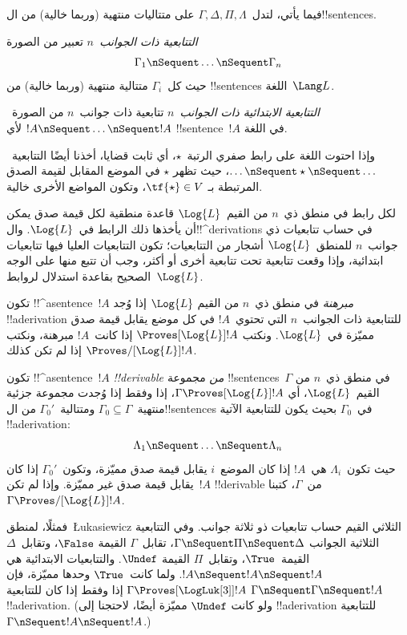 \documentclass[../../../include/open-logic-section]{subfiles}
\begin{document}


فيما يأتي، لتدل~$\Gamma, \Delta, \Pi, \Lambda$ على متتاليات منتهية
(وربما خالية) من ال!!{sentence}s.

\begin{defn}[التتابعية]
\emph{التتابعية ذات الجوانب~$n$} تعبير من الصورة
\[
\Gamma_1 \nSequent \dots \nSequent \Gamma_n
\]
حيث كل~$\Gamma_i$ متتالية منتهية (وربما خالية) من !!{sentence}s
اللغة~$\Lang L$.
\end{defn}

\begin{defn}
\emph{التتابعية الابتدائية ذات الجوانب~$n$} تتابعية ذات جوانب~$n$ من
الصورة~$!A \nSequent \dots \nSequent !A$ لأي !!{sentence}~$!A$ في
اللغة.

وإذا احتوت اللغة على رابط صفري الرتبة~$\star$، أي ثابت قضايا، أخذنا
أيضًا التتابعية~$\dots \nSequent \star \nSequent \dots$، حيث تظهر
$\star$ في الموضع المقابل لقيمة الصدق المرتبطة بـ
$\tf{\star} \in V$، وتكون المواضع الأخرى خالية.
\end{defn}

لكل رابط في منطق ذي~$n$ من القيم~$\Log{L}$ قاعدة منطقية لكل قيمة صدق
يمكن أن يأخذها ذلك الرابط في~$\Log{L}$. وال!!^{derivation}s في حساب
تتابعيات ذي جوانب~$n$ للمنطق~$\Log{L}$ أشجار من التتابعيات؛ تكون
التتابعيات العليا فيها تتابعيات ابتدائية، وإذا وقعت تتابعية تحت
تتابعية أخرى أو أكثر، وجب أن تتبع منها على الوجه الصحيح بقاعدة
استدلال لروابط~$\Log{L}$.

\begin{defn}[المبرهنات]
تكون !!^a{sentence}~$!A$ \emph{مبرهنة} في منطق ذي~$n$ من القيم
$\Log{L}$ إذا وُجد !!a{derivation} للتتابعية ذات الجوانب~$n$ التي
تحتوي~$!A$ في كل موضع يقابل قيمة صدق مميّزة في~$\Log{L}$. ونكتب
$\Proves[\Log{L}] !A$ إذا كانت~$!A$ مبرهنة، ونكتب
$\Proves/[\Log{L}] !A$ إذا لم تكن كذلك.
\end{defn}

\begin{defn}[!!^{derivability}]
تكون !!^a{sentence}~$!A$ \emph{!!{derivable} من} مجموعة
!!{sentence}s~$\Gamma$ في منطق ذي~$n$ من القيم~$\Log{L}$، أي
$\Gamma \Proves[\Log{L}] !A$، إذا وفقط إذا وُجدت مجموعة جزئية
منتهية~$\Gamma_0 \subseteq \Gamma$ ومتتالية~$\Gamma_0'$ من
ال!!{sentence}s في~$\Gamma_0$ بحيث يكون للتتابعية الآتية
!!a{derivation}:
\[ \Lambda_1 \nSequent \dots \nSequent \Lambda_n \]
حيث تكون~$\Lambda_i$ هي~$!A$ إذا كان الموضع~$i$ يقابل قيمة صدق
مميّزة، وتكون~$\Gamma_0'$ إذا كان يقابل قيمة صدق غير مميّزة. وإذا لم
تكن~$!A$ !!{derivable} من~$\Gamma$، كتبنا
$\Gamma \Proves/[\Log{L}] !A$.
\end{defn}

فمثلًا، لمنطق~\L ukasiewicz الثلاثي القيم حساب تتابعيات ذو ثلاثة
جوانب. وفي التتابعية الثلاثية الجوانب
$\Gamma \nSequent \Pi \nSequent \Delta$، تقابل~$\Gamma$ القيمة
$\False$، وتقابل~$\Delta$ القيمة~$\True$، وتقابل~$\Pi$ القيمة
$\Undef$. والتتابعيات الابتدائية هي
$!A \nSequent !A \nSequent !A$. ولما كانت~$\True$ وحدها مميّزة، فإن
$\Gamma \Proves[\LogLuk[3]] !A$ إذا وفقط إذا كان للتتابعية
$\Gamma \nSequent \Gamma \nSequent !A$ !!a{derivation}. (ولو كانت
$\Undef$ مميّزة أيضًا، لاحتجنا إلى !!a{derivation} للتتابعية
$\Gamma \nSequent !A \nSequent !A$.)
\end{document}

